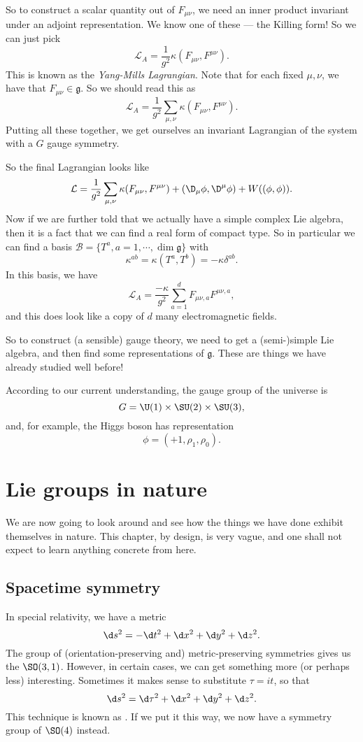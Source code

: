 \documentclass[a4paper]{article}
\begin{document}
So to construct a scalar quantity out of $F_{\mu\nu}$, we need an inner product invariant under an adjoint representation. We know one of these --- the Killing form! So we can just pick
\[
  \mathcal{L}_A = \frac{1}{g^2} \kappa(F_{\mu\nu}, F^{\mu\nu}).
\]
This is known as the \emph{Yang-Mills Lagrangian}. Note that for each fixed $\mu, \nu$, we have that $F_{\mu\nu} \in \mathfrak{g}$. So we should read this as
\[
  \mathcal{L}_A = \frac{1}{g^2} \sum_{\mu, \nu} \kappa(F_{\mu\nu}, F^{\mu\nu}).
\]
Putting all these together, we get ourselves an invariant Lagrangian of the system with a $G$ gauge symmetry.

So the final Lagrangian looks like
\[
  \mathcal{L} = \frac{1}{g^2} \sum_{\mu, \nu} \kappa(F_{\mu\nu}, F^{\mu\nu}) + (\D_\mu \phi, \D^\mu \phi) + W((\phi, \phi)).
\]
Now if we are further told that we actually have a simple complex Lie algebra, then it is a fact that we can find a real form of compact type. So in particular we can find a basis $\mathcal{B} = \{T^a, a = 1, \cdots, \dim \mathfrak{g}\}$ with
\[
  \kappa^{ab} = \kappa(T^a, T^b) = - \kappa \delta^{ab}.
\]
In this basis, we have
\[
  \mathcal{L}_A = \frac{-\kappa}{g^2} \sum_{a = 1}^d F_{\mu\nu, a} F^{\mu\nu, a},
\]
and this does look like a copy of $d$ many electromagnetic fields.

So to construct (a sensible) gauge theory, we need to get a (semi-)simple Lie algebra, and then find some representations of $\mathfrak{g}$. These are things we have already studied well before!

According to our current understanding, the gauge group of the universe is
\[
  G = \U(1) \times \SU(2) \times \SU(3),
\]
and, for example, the Higgs boson has representation
\[
  \phi = (+1, \rho_1, \rho_0).
\]

\section{Lie groups in nature}
We are now going to look around and see how the things we have done exhibit themselves in nature. This chapter, by design, is very vague, and one shall not expect to learn anything concrete from here.

\subsection{Spacetime symmetry}
In special relativity, we have a metric
\[
  \d s^2 = -\d t^2 + \d x^2 + \d y^2 + \d z^2.
\]
The group of (orientation-preserving and) metric-preserving symmetries gives us the  $\SO(3, 1)$. However, in certain cases, we can get something more (or perhaps less) interesting. Sometimes it makes sense to substitute $\tau = i t$, so that
\[
  \d s^2 = \d \tau^2 + \d x^2 + \d y^2 + \d z^2.
\]
This technique is known as . If we put it this way, we now have a symmetry group of $\SO(4)$ instead.
\end{document}

